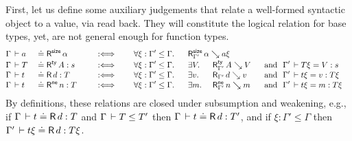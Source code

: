 \documentclass[acmlarge,review,anonymous]{acmart}\settopmatter{printfolios=true}
\begin{document}
First, let us define some auxiliary judgements that relate a
well-formed syntactic object to a value, via read back.
They will constitute the logical relation for base types,
yet, are not general enough for function types.
\begin{alignat*}{8}
& \Gamma \der a && \doteq \tRsize\, \alpha
  && \quad\defas\quad
  && \forall \xi : \Gamma' \leq \Gamma.\ \
  && \mathrlap{ \RSize {\Gamma'} \alpha {a\xi} }
\\[-0.6ex]
& \Gamma \der T && \doteq \tRty\, A  : s
  && \quad\defas\quad
  && \forall \xi : \Gamma' \leq \Gamma.\ \
  && \exists V.\
  && \RTy{\Gamma'} A V
  && ~\mand~ \Gamma' \der T\xi = V : s
\\[-0.6ex]
& \Gamma \der t && \doteq \tR\, d  : T
  && \quad\defas\quad
  && \forall \xi : \Gamma' \leq \Gamma.\ \
  && \exists v.\
  && \R{\Gamma'} d v
  && ~\mand~ \Gamma' \der t\xi = v : T\xi
\\[-0.6ex]
& \Gamma \der t && \doteq \tRne\, n  : T
  && \quad\defas\quad
  && \forall \xi : \Gamma' \leq \Gamma.\ \
  && \exists m.\
  && \RNe{\Gamma'} n m
  && ~\mand~ \Gamma' \der t\xi = m : T\xi
\end{alignat*}
By definitions, these relations are closed under subsumption and
weakening, e.g., if\/ $\Gamma \,\vdash t \doteq \mathsf{R}\, d : T$ and $\Gamma \,\vdash T \leq T'$ then $\Gamma \,\vdash t \doteq \mathsf{R}\, d : T'$,
and if\/ $\xi : \Gamma' \leq \Gamma$ then $\Gamma' \,\vdash t\xi \doteq \mathsf{R}\, d : T\xi$.
\end{document}
